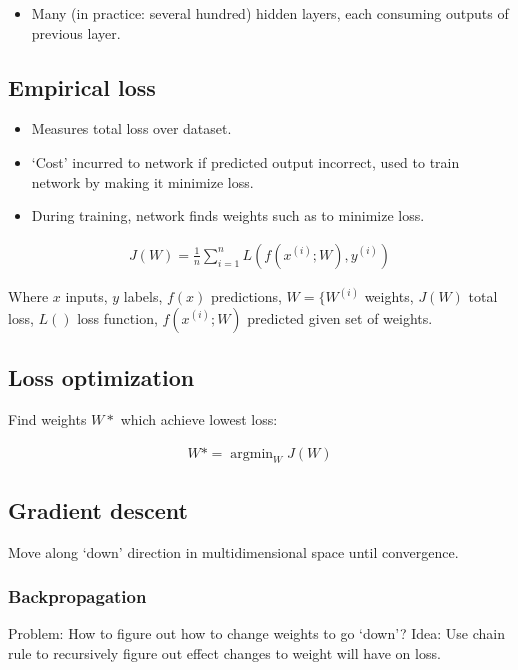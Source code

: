 \begin{itemize}
		\item Many (in practice: several hundred) hidden layers, each consuming
				outputs of previous layer.
\end{itemize}

\subsection{Empirical loss}

\begin{itemize}
		\item Measures total loss over dataset.
		\item `Cost' incurred to network if predicted output incorrect, used to
				train network by making it minimize loss.
		\item During training, network finds weights such as to minimize loss.
\end{itemize}

\begin{align*}
		J(W) = \frac{1}{n} \sum_{i = 1}^n L(f(x^{(i)}; W), y^{(i)})
\end{align*}

Where $x$ inputs, $y$ labels, $f(x)$ predictions, $W = \{W^{(i)}$ weights,
		$J(W)$ total loss, $L()$ loss function, $f(x^{(i)}; W)$ predicted given
		set of weights.

\subsection{Loss optimization}

Find weights $W*$ which achieve lowest loss:

\begin{align*}
		W* = \operatorname{argmin}_W J(W)
\end{align*}

\subsection{Gradient descent}

Move along `down' direction in multidimensional space until convergence.

\subsubsection{Backpropagation}

Problem: How to figure out how to change weights to go `down'? Idea: Use chain
rule to recursively figure out effect changes to weight will have on loss.

